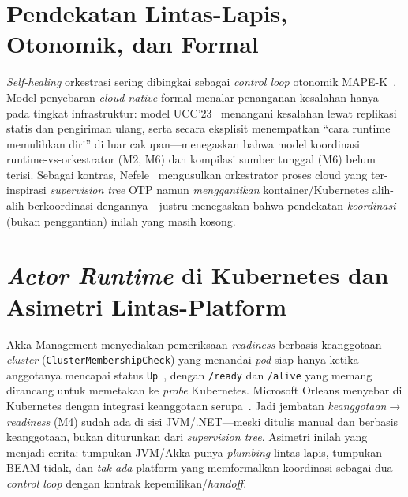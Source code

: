 \section{Pendekatan Lintas-Lapis, Otonomik, dan Formal}
\label{sec:lit-crosslayer}
\emph{Self-healing} orkestrasi sering dibingkai sebagai \emph{control loop} otonomik
MAPE-K~\cite{kephart2003}. Model penyebaran \emph{cloud-native} formal menalar penanganan
kesalahan hanya pada tingkat infrastruktur: model UCC'23~\cite{ucc23} menangani kesalahan
lewat replikasi statis dan pengiriman ulang, serta secara eksplisit menempatkan ``cara
runtime memulihkan diri'' di luar cakupan---menegaskan bahwa model koordinasi
runtime-vs-orkestrator (M2, M6) dan kompilasi sumber tunggal (M6) belum terisi. Sebagai
kontras, Nefele~\cite{nefele} mengusulkan orkestrator proses cloud yang ter-inspirasi
\emph{supervision tree} OTP namun \emph{menggantikan} kontainer/Kubernetes alih-alih
berkoordinasi dengannya---justru menegaskan bahwa pendekatan \emph{koordinasi} (bukan
penggantian) inilah yang masih kosong.

\section{\emph{Actor Runtime} di Kubernetes dan Asimetri Lintas-Platform}
\label{sec:lit-actors}
Akka Management menyediakan pemeriksaan \emph{readiness} berbasis keanggotaan
\emph{cluster} (\texttt{ClusterMembershipCheck}) yang menandai \emph{pod} siap hanya ketika
anggotanya mencapai status \texttt{Up}~\cite{akkaHealth}, dengan \texttt{/ready} dan
\texttt{/alive} yang memang dirancang untuk memetakan ke \emph{probe} Kubernetes. Microsoft
Orleans menyebar di Kubernetes dengan integrasi keanggotaan serupa~\cite{orleans}. Jadi
jembatan \emph{keanggotaan$\rightarrow$readiness} (M4) sudah ada di sisi JVM/.NET---meski
ditulis manual dan berbasis keanggotaan, bukan diturunkan dari \emph{supervision tree}.
Asimetri inilah yang menjadi cerita: tumpukan JVM/Akka punya \emph{plumbing} lintas-lapis,
tumpukan BEAM tidak, dan \emph{tak ada} platform yang memformalkan koordinasi sebagai dua
\emph{control loop} dengan kontrak kepemilikan/\emph{handoff}.

